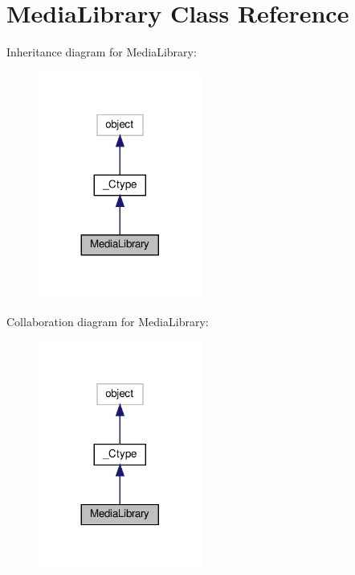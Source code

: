 \hypertarget{classvlc_1_1_media_library}{}\section{Media\+Library Class Reference}
\label{classvlc_1_1_media_library}


Inheritance diagram for Media\+Library\+:
\nopagebreak
\begin{figure}[H]
\begin{center}
\leavevmode
\includegraphics[width=152pt]{classvlc_1_1_media_library__inherit__graph}
\end{center}
\end{figure}


Collaboration diagram for Media\+Library\+:
\nopagebreak
\begin{figure}[H]
\begin{center}
\leavevmode
\includegraphics[width=152pt]{classvlc_1_1_media_library__coll__graph}
\end{center}
\end{figure}
